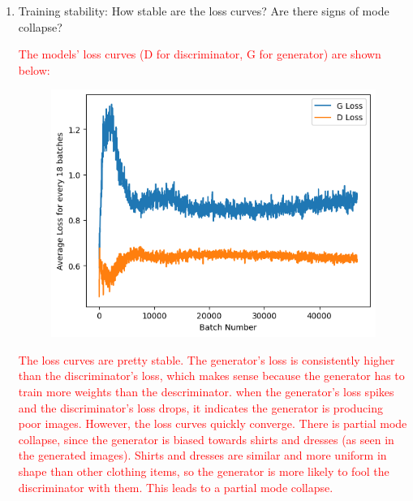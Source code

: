 \documentclass{genai}
\begin{document}
\begin{enumerate}
	\item Training stability: How stable are the loss curves? Are there signs of mode collapse?
 
	\textcolor{red}{The models' loss curves (D for discriminator, G for generator) are shown below:}
 
        \newpage

	\begin{figure}[t]
		\includegraphics[width=.7\linewidth]{loss_chart.png}
	\end{figure}

	\textcolor{red}{The loss curves are pretty stable. The generator's loss is consistently higher than the discriminator's loss, which makes sense because the generator has to train more weights than the descriminator. 
		when the generator's loss spikes and the discriminator's loss drops, it indicates the generator is producing poor images.
		However, the loss curves quickly converge. There is partial mode collapse, since the generator is biased towards shirts and dresses (as seen in the generated images).
		Shirts and dresses are similar and more uniform in shape than other clothing items, so the generator is more likely to fool the discriminator with them.
		This leads to a partial mode collapse.
	}

\end{enumerate}
\end{document}
